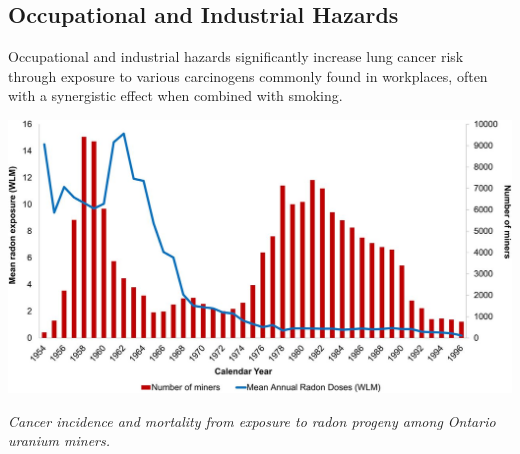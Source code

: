 \subsection{Occupational and Industrial Hazards}

Occupational and industrial hazards significantly increase lung cancer risk through exposure to 
various carcinogens commonly found in workplaces, often with a synergistic effect when combined 
with smoking.

\vspace{1em} 
\begin{center} 
    \includegraphics[width=\textwidth]{../assets/02-etiology/mortality_from_exposure_to_uranium.jpg}

    \small\textit{Cancer incidence and mortality from exposure to radon progeny among Ontario uranium
    miners. \cite{Navaranjan838}}
\end{center} 
\vspace{1em} 

\newpage

